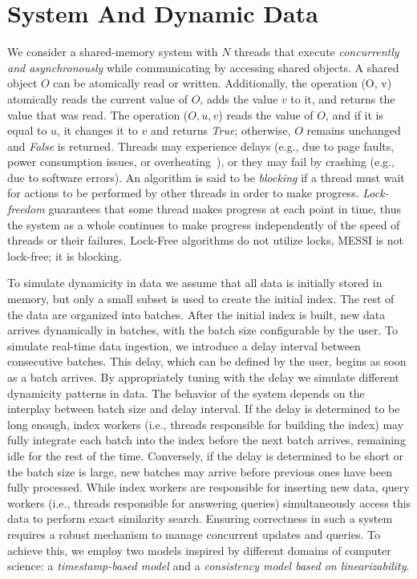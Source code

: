 \section{System And Dynamic Data}
We consider a shared-memory system with \( N \) threads that execute {\em concurrently
and asynchronously} while communicating by accessing shared objects. A shared object
\( O \) can be atomically read or written. Additionally, the operation \FAI(O, v)
atomically reads the current value of \( O \), adds the value \( v \) to it, and
returns the value that was read. The operation \CAS($O, u, v$) reads the value of
\( O \), and if it is equal to \( u \), it changes it to \( v \) and returns
\textit{True}; otherwise, \( O \) remains unchanged and \textit{False} is returned.
% 
Threads may experience delays (e.g., due to page faults, power consumption issues,
or overheating~\cite{inteloverheating}), or they may fail by crashing (e.g., due to
software errors). An algorithm is said to be {\em blocking} if a thread must wait for
actions to be performed by other threads in order to make progress. {\em Lock-freedom}
guarantees that some thread makes progress at each point in time, thus 
the system as a whole continues to make progress independently of the speed of threads
or their failures. Lock-Free algorithms do not utilize locks, MESSI is not lock-free;
it is blocking.


 
 To simulate dynamicity in data we assume that all data is initially stored in memory, but
only a small subset is used to create the initial index. The rest of the data are organized into batches.
After the initial index is built, new data arrives dynamically in batches, with the batch size
configurable by the user. To simulate real-time data ingestion, we introduce a delay interval
between consecutive batches. This delay, which can be defined by the user,
begins as soon as a batch arrives. By appropriately tuning with the delay we simulate different
dynamicity patterns in data. 
% 
The behavior of the system depends on the interplay between batch size and delay interval.
If the delay is determined to be long enough, index workers (i.e., threads responsible for building the index)
may fully integrate each batch into the index before the next batch arrives, remaining idle for
the rest of the time. Conversely, if the delay is determined to be short or the batch size is large, new batches
may arrive before previous ones have been fully processed.
% 
While index workers are responsible for inserting new data, query workers (i.e., threads
responsible for answering queries) simultaneously access this data to perform
exact similarity search. Ensuring correctness in such a system requires a robust mechanism to
manage concurrent updates and queries. To achieve this, we employ two models inspired by different
domains of computer science: a \textit{timestamp-based model} and a \textit{consistency model based
on linearizability}.  

